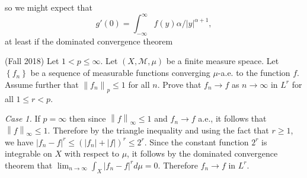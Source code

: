 \documentclass[answers]{exam}
\theoremstyle{problemstyle}
\newcommand{\norm}[1]{\left\lVert#1\right\rVert} %
\newcommand{\1}[1]{\textbf{1}_{\left[#1\right]}} %
\begin{document}
\begin{questions}
\begin{parts}
\begin{solution}
        
        so we might expect that
        \[ g'(0) = \int_{-\infty}^\infty f(y) \alpha / |y|^{\alpha+1}, \]
        at least if the dominated convergence theorem
    \end{solution}
\end{parts}

\question (Fall 2018)
  Let $1<p\leq \infty$. Let $(X,\mathcal{M},\mu)$ be a finite measure speace. Let $\left\{ f_{n} \right\}$ be a sequence of measurable functions converging $\mu$-a.e. to the function $f$. Assume further that $\norm{f_{n}}_{p}\leq 1$ for all $n$. Prove that $f_{n}\to f$ as $n\to \infty$ in $L^{r}$ for all $1\leq r<p$.
\begin{solution}
  \textit{Case 1.} If $p=\infty$ then since $\norm{f}_{\infty}\leq 1$ and $f_{n}\to f$ a.e., it follows that $\norm{f}_{\infty}\leq 1$. Therefore by the triangle inequality and using the fact that $r\geq 1$, we have $|f_{n}-f|^{r}\leq (|f_{n}| + |f| )^{r}\leq 2^{r}$. Since the constant function $2^{r}$ is integrable on $X$ with respect to $\mu$, it follows by the dominated convergence theorem that $\lim_{n\to\infty}\int_{X} |f_{n}-f|^{r}d\mu = 0$. Therefore $f_{n}\to f$ in $L^{r}$.


\end{solution}
\end{questions}
\end{document}
